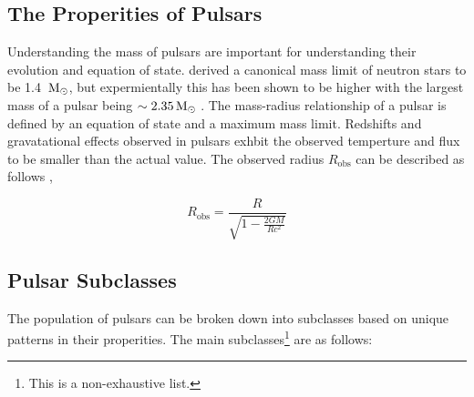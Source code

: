 \subsection{The Properities of Pulsars}

Understanding the mass of pulsars are important for understanding their evolution and equation of state. \cite{oppenheimer_massive_1939} derived a canonical mass limit of neutron stars to be 1.4 $\, \text{M}_\odot$, but expermientally this has been shown to be higher with the largest mass of a pulsar being $\sim 2.35 \, \text{M}_\odot$ \citep{Romani_2022}. The mass-radius relationship of a pulsar is defined by an equation of state and a maximum mass limit. Redshifts and gravatational effects observed in pulsars exhbit the observed temperture and flux to be smaller than the actual value. The observed radius $R_\text{obs}$ can be described as follows \citep{pulsar_handbook}, 

\begin{equation}
    R_\text{obs} = \frac{R}{\sqrt{1 - \frac{2GM}{Rc^2}}}
\end{equation}

\subsection{Pulsar Subclasses}

The population of pulsars can be broken down into subclasses based on unique patterns in their properities. The main subclasses\footnote{This is a non-exhaustive list.} are as follows:

